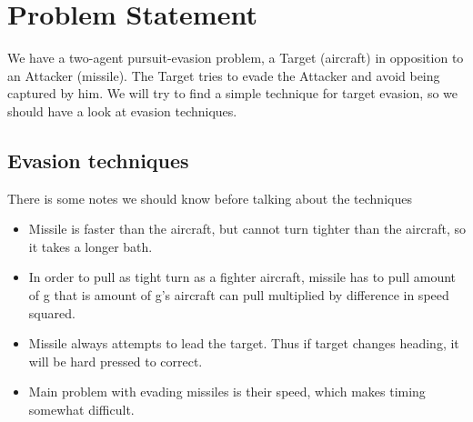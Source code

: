 \section{Problem Statement}
We have a two-agent pursuit-evasion problem, a Target (aircraft) in opposition to an Attacker (missile). The Target tries to evade the Attacker and avoid being captured by him. We will try to find a simple technique for target evasion, so we should have a look at evasion techniques.

\subsection{Evasion techniques}
There is some notes we should know before talking about the techniques 
\begin{itemize}
	\item Missile is faster than the aircraft, but cannot turn tighter than the aircraft, so it takes a longer bath.
	\item In order to pull as tight turn as a fighter aircraft, missile has to pull amount of g that is amount of g’s aircraft can pull multiplied by difference in speed squared.
	\item Missile always attempts to lead the target. Thus if target changes heading, it will be hard pressed to correct.
	\item  Main problem with evading missiles is their speed, which makes timing somewhat difficult.
\end{itemize}

